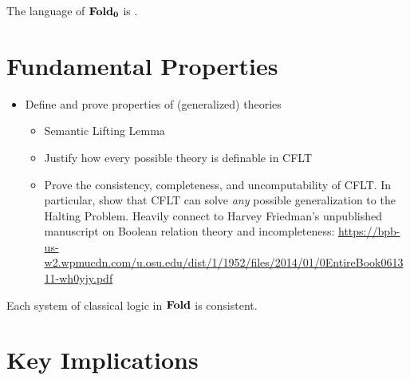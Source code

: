 \begin{definition}
The language of $\mathbf{Fold_0}$ is .
\end{definition}


\section{Fundamental Properties}
\begin{itemize}
  \item Define and prove properties of (generalized) theories
  \begin{itemize}
    \item Semantic Lifting Lemma
    \item Justify how every possible theory is definable in CFLT
    \item Prove the consistency, completeness, and uncomputability of CFLT. In particular, show that CFLT can solve \textit{any} possible generalization to the Halting Problem. Heavily connect to Harvey Friedman's unpublished manuscript on Boolean relation theory and incompleteness: \url{https://bpb-us-w2.wpmucdn.com/u.osu.edu/dist/1/1952/files/2014/01/0EntireBook061311-wh0yjy.pdf} \end{itemize}
\end{itemize}

\begin{theorem}
Each system of classical logic in $\mathbf{Fold}$ is consistent.
\end{theorem}

\section{Key Implications}
